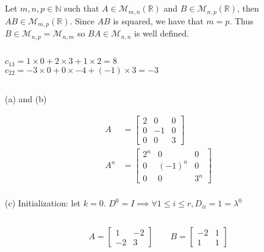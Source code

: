 \documentclass{article}
\newcommand{\R}{\mathbb{R}}
\newcommand{\N}{\mathbb{N}}
\begin{document}
\subsection{}
Let \(m, n, p \in \N\) such that \(A \in \mathcal{M}_{m, n} (\R)\) and \(B \in \mathcal{M}_{n, p} (\R)\), then \(AB \in \mathcal{M}_{m,p} (\R)\). Since \(AB\) is squared, we have that \(m = p\). Thus \(B \in \mathcal{M}_{n,p} = \mathcal{M}_{n,m}\) so \(BA \in \mathcal{M}_{n,n}\) is well defined.

\subsection{}
\(c_{13} = 1 \times 0 + 2 \times 3 + 1 \times 2 = 8\) \\
\(c_{22} = -3 \times 0 + 0 \times -4 + (-1) \times 3 = -3\)

\subsection{}
\subsection{}
(a) and (b)

\begin{align*}
    A   & =
    \begin{bmatrix}
        2 & 0  & 0 \\
        0 & -1 & 0 \\
        0 & 0  & 3
    \end{bmatrix} \\
    A^n & =
    \begin{bmatrix}
        2^n & 0      & 0   \\
        0   & (-1)^n & 0   \\
        0   & 0      & 3^n
    \end{bmatrix} \\
\end{align*}

(c)
Initialization: let \(k=0\). \(D^0 = I \implies \forall 1 \leq i \leq r, D_{ii} = 1 = \lambda^0\)

\subsection{}
\[
    A =
    \begin{bmatrix}
        1  & -2 \\
        -2 & 3
    \end{bmatrix}
    \qquad
    B =
    \begin{bmatrix}
        -2 & 1 \\
        1  & 1
    \end{bmatrix}
\]
\end{document}

